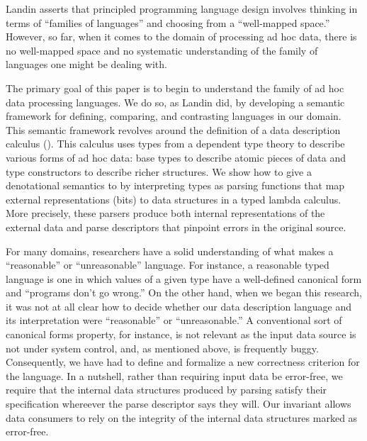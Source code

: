 Landin asserts that principled programming language design
involves thinking in terms of ``families of languages'' and
choosing from a ``well-mapped space.''  However, so far,
when it comes to the domain of processing ad hoc data, 
there is no well-mapped space and no systematic understanding
of the family of languages one might be dealing with.

The primary goal of this paper is to begin to understand the
family of ad hoc data processing languages.  We do so,
as Landin did, by developing a semantic
framework for defining, comparing, and contrasting languages
in our domain.  This semantic framework revolves around the
definition of a data description calculus (\ddc{}).  
This calculus uses types from a dependent type theory to describe
various forms of ad hoc data:
base types to describe atomic pieces of data and
type constructors to describe richer structures.
We show how to give a denotational semantics
to \ddc{} by interpreting
types as parsing functions that map external representations (bits)
to data structures in a typed lambda calculus.  More precisely,
these parsers produce both 
internal representations of the external data and
parse descriptors that pinpoint errors in the original source.

For many domains, researchers have a solid understanding of
what makes a ``reasonable'' or ``unreasonable'' language.  For instance,
a reasonable typed language is one in which values of a given type
have a well-defined canonical form and ``programs don't go wrong.''
On the other hand, when we began this research, it
was not at all clear
how to decide whether our data description language and
its interpretation were ``reasonable'' or ``unreasonable.''  
A conventional sort
of canonical forms property, for instance, 
is not relevant as the input data source
is not under system control, and, as
mentioned above, is frequently buggy.  Consequently,
we have had to define and formalize a new correctness criterion 
for the language. 
In a nutshell, rather than requiring input data be error-free, we require
that the internal data structures produced by parsing 
satisfy their specification whereever the parse descriptor says they
will.  Our invariant allows
data consumers to rely on the integrity of the internal data structures
marked as error-free. 

